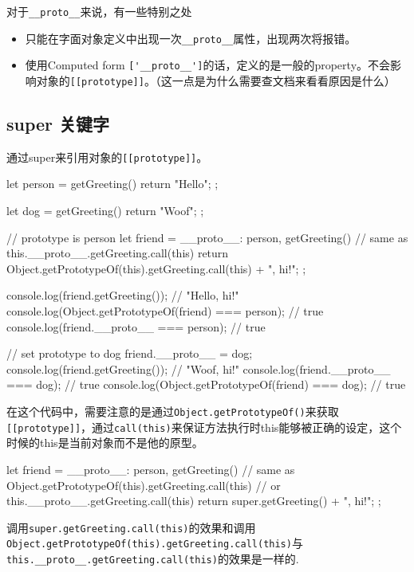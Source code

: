 对于\lstinline$__proto__$来说，有一些特别之处
\begin{itemize}
\item 只能在字面对象定义中出现一次\lstinline$__proto__$属性，出现两次将报错。
\item 使用Computed form \lstinline$['__proto__']$的话，定义的是一般的property。不会影响对象的\lstinline$[[prototype]]$。（这一点是为什么需要查文档来看看原因是什么）
\end{itemize}

\subsection{super 关键字}
通过super来引用对象的\lstinline$[[prototype]]$。
\begin{JavaScript}
let person = {
    getGreeting() {
        return "Hello";
    }
};

let dog = {
    getGreeting() {
        return "Woof";
    }
};

// prototype is person
let friend = {
    __proto__: person,
    getGreeting() {
        // same as this.__proto__.getGreeting.call(this)
        return Object.getPrototypeOf(this).getGreeting.call(this) + ", hi!";
    }
};

console.log(friend.getGreeting());                      // "Hello, hi!"
console.log(Object.getPrototypeOf(friend) === person);  // true
console.log(friend.__proto__ === person);               // true

// set prototype to dog
friend.__proto__ = dog;
console.log(friend.getGreeting());                      // "Woof, hi!"
console.log(friend.__proto__ === dog);                  // true
console.log(Object.getPrototypeOf(friend) === dog);     // true
\end{JavaScript}

在这个代码中，需要注意的是通过\lstinline$Object.getPrototypeOf()$来获取\lstinline$[[prototype]]$，通过\lstinline$call(this)$来保证方法执行时this能够被正确的设定，这个时候的this是当前对象而不是他的原型。

\begin{JavaScript}
let friend = {
    __proto__: person,
    getGreeting() {
        // same as Object.getPrototypeOf(this).getGreeting.call(this)
        // or this.__proto__.getGreeting.call(this)
        return super.getGreeting() + ", hi!";
    }
};
\end{JavaScript}

调用\lstinline$super.getGreeting.call(this)$的效果和调用\lstinline$Object.getPrototypeOf(this).getGreeting.call(this)$与\lstinline$this.__proto__.getGreeting.call(this)$的效果是一样的. 

